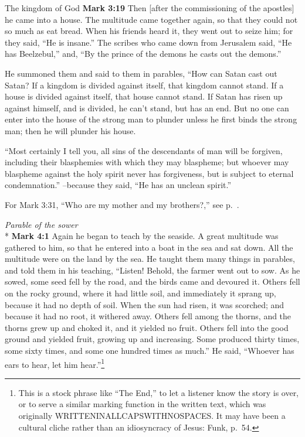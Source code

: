 \documentclass[10pt,a5paper,twoside]{article}
\newcommand{\doimage}[2]{\texttt{[image: \#2]}\label{fig:#2}}
\newcommand{\figbasic}[4]{ %
    \ifthenelse{\isodd{\pageref{fig:#2}}}{}{\hfill}
    \ifstrempty{#3}{
      \doimage{#1}{#2}
    }{
      \makebox{\doimage{#1}{#2} \\ #3}
    }
    \ifthenelse{\isodd{\pageref{fig:#2}}}{\hfill}{}
    \par
}
\newcommand{\fig}[2][0.4]{
  \figbasic{#1}{#2}{}{}
}
\newcommand{\quotesize}{\normalsize{}}
\newcommand{\comm}[1]{\begingroup \color{black!50} #1\endgroup}
\newenvironment{quotetext}{\begingroup\quotesize}{\endgroup}
\newcommand{\intex}[1]{\index[texts]{#1}}
\newcommand{\bible}[2]{\begin{quotetext}\textbf{#1}\intex{#1} #2\end{quotetext}}
\newcommand{\gospelmark}[2]{\bible{Mark #1}{#2}}
\newcommand{\subhead}[1]{\emph{#1}\\*}
\begin{document}
\begin{section}{The kingdom of God}
\gospelmark{3:19}{
Then [after the commissioning of the apostles] he came into a house.   The multitude came together again, so that they could not so much as eat bread.   When his friends heard it, they went out to seize him; for they said, ``He is insane.''   The scribes who came down from Jerusalem said, ``He has Beelzebul,'' and, ``By the prince of the demons he casts out the demons.''

  He summoned them and said to them in parables, ``How can Satan cast out Satan?    If a kingdom is divided against itself, that kingdom cannot stand.    If a house is divided against itself, that house cannot stand.    If Satan has risen up against himself, and is divided, he can't stand, but has an end.    But no one can enter into the house of the strong man to plunder unless he first binds the strong man; then he will plunder his house.

   ``Most certainly I tell you, all sins of the descendants of man will be forgiven, including their blasphemies with which they may blaspheme;    but whoever may blaspheme against the holy spirit never has forgiveness, but is subject to eternal condemnation.''   --because they said, ``He has an unclean spirit.''\label{how-can-satan}
}

\comm{For Mark 3:31, ``Who are my mother and my brothers?,'' see p.~\pageref{who-are-my-mother-and-my-brothers}.}

\fig{sower}

\subhead{Parable of the sower}
\gospelmark{4:1}{
   Again he began to teach by the seaside. A great multitude was gathered to him, so that he entered into a boat in the sea and sat down. All the multitude were on the land by the sea.   He taught them many things in parables, and told them in his teaching,    ``Listen! Behold, the farmer went out to sow.    As he sowed, some seed fell by the road, and the birds came and devoured it.    Others fell on the rocky ground, where it had little soil, and immediately it sprang up, because it had no depth of soil.    When the sun had risen, it was scorched; and because it had no root, it withered away.    Others fell among the thorns, and the thorns grew up and choked it, and it yielded no fruit.    Others fell into the good ground and yielded fruit, growing up and increasing. Some produced thirty times, some sixty times, and some one hundred times as much.''   
He said, ``Whoever has ears to hear, let him hear.''\footnote{This is a stock phrase like ``The End,'' to let a listener know the story
is over, or to serve a similar marking function in the written text, which was originally WRITTENINALLCAPSWITHNOSPACES. It may have been
a cultural cliche rather than an idiosyncracy of Jesus: Funk, p.~54.}

}
\end{section}
\end{document}
